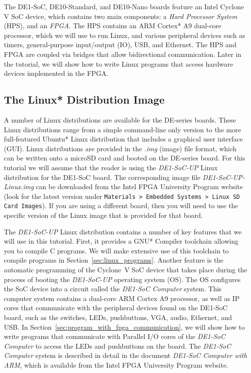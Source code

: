 \documentclass[11pt, twoside, pdftex]{article}
\begin{document}
The DE1-SoC, DE10-Standard, and DE10-Nano boards feature an Intel Cyclone V 
SoC device, which contains two main components: 
a {\it Hard Processor System} (HPS), and an {\it FPGA}. 
The HPS contains an ARM Cortex* A9 dual-core processor, which we will use to run Linux, and 
various peripheral devices such as timers, 
general-purpose input/output (IO), USB, and Ethernet. The HPS and FPGA are coupled via 
bridges that allow bidirectional communication. Later in the tutorial, we will show how 
to write Linux programs that access hardware devices implemented in the FPGA.

\subsection{The Linux* Distribution Image}

A number of Linux distributions are available for the DE-series boards. These Linux distributions 
range from a simple command-line only version to the more full-featured Ubuntu* Linux 
distribution that includes a graphical user interface (GUI). Linux distributions are provided 
in the \textit{.img} (image) file format, which can be written onto a microSD card and booted 
on the DE-series board. For this tutorial we will assume that the reader is using the 
\textit{DE1-SoC-UP} Linux distribution for the DE1-SoC board. The corresponding image 
file \textit{DE1-SoC-UP-Linux.img} can be downloaded from the Intel FPGA University Program 
website (look for the latest version under \texttt{Materials > Embedded Systems > Linux SD Card Images}). 
If you are using a different board, then you will need to use the specific version of the 
Linux image that is provided for that board.

The \textit{DE1-SoC-UP} Linux distribution contains a number of key features that we will use 
in this tutorial. First, it provides a GNU* Compiler toolchain allowing you to compile C programs.
We will make extensive use of this toolchain to compile programs in 
Section~\ref{sec:linux_programs}. Another feature is the automatic programming of the Cyclone~V SoC
device that takes place during the process of booting the \textit{DE1-SoC-UP} operating system
(OS). The OS configures the SoC device into a circuit called the \textit{DE1-SoC Computer} system.
This computer system contains a dual-core ARM Cortex A9 processor, as well as IP cores that 
communicate with the peripheral devices found on the DE1-SoC board, such as the switches, 
LEDs, pushbuttons, VGA, audio, Ethernet, and USB. In 
Section~\ref{sec:program_with_fpga_communication}, we will 
show how to write programs that communicate with Parallel I/O cores of the 
\textit{DE1-SoC Computer} to access the LEDs and pushbuttons on the board. 
The \textit{DE1-SoC Computer} system is described in detail in the document 
\textit{DE1-SoC Computer with ARM}, which is available from the Intel FPGA University
Program website.
\end{document}
